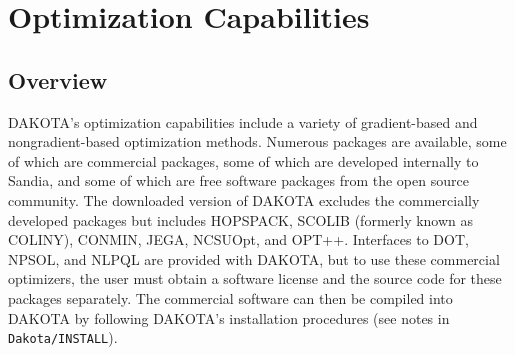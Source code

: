 \chapter{Optimization Capabilities}\label{opt}

\section{Overview}\label{opt:overview}

DAKOTA's optimization capabilities include a variety of gradient-based
and nongradient-based optimization methods. Numerous packages are
available, some of which are commercial packages, some of which are
developed internally to Sandia, and some of which are free software
packages from the open source community. The downloaded version of
DAKOTA excludes the commercially developed packages but includes
HOPSPACK, SCOLIB (formerly known as COLINY), CONMIN, JEGA, NCSUOpt,
and OPT++. Interfaces to DOT, NPSOL, and NLPQL are provided with
DAKOTA, but to use these commercial optimizers, the user must obtain a
software license and the source code for these packages
separately. The commercial software can then be compiled into DAKOTA
by following DAKOTA's installation procedures (see notes in
\texttt{Dakota/INSTALL}).

